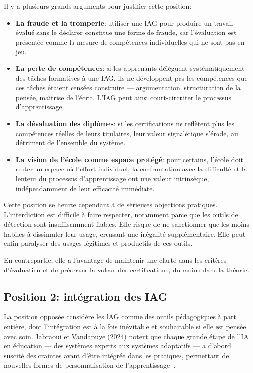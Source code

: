 Il y a plusieurs grands arguments pour justifier cette position:

\begin{itemize}
    \item \textbf{La fraude et la tromperie}: utiliser une IAG pour produire un travail \'evalu\'e sans le d\'eclarer constitue une forme de fraude, car l'\'evaluation est pr\'esent\'ee comme la mesure de comp\'etences individuelles qui ne sont pas en jeu.
    \item \textbf{La perte de comp\'etences}: si les apprenants d\'el\`eguent syst\'ematiquement des t\^aches formatives \`a une IAG, ils ne d\'eveloppent pas les comp\'etences que ces t\^aches \'etaient cens\'ees construire --- argumentation, structuration de la pens\'ee, ma\^\i trise de l'\'ecrit. 
    L'IAG peut ainsi \og{}court-circuiter\fg{} le processus d'apprentissage.
    \item \textbf{La d\'evaluation des dipl\^omes}: si les certifications ne refl\`etent plus les comp\'etences r\'eelles de leurs titulaires, leur valeur signal\'etique s'\'erode, au d\'etriment de l'ensemble du syst\`eme.
    \item \textbf{La vision de l'\'ecole comme espace prot\'eg\'e}: pour certains, l'\'ecole doit rester un espace o\`u l'effort individuel, la confrontation avec la difficult\'e et la lenteur du processus d'apprentissage ont une valeur intrins\`eque, ind\'ependamment de leur efficacit\'e imm\'ediate.
\end{itemize}

Cette position se heurte cependant \`a de s\'erieuses objections pratiques. 
L'interdiction est difficile \`a faire respecter, notamment parce que les outils de d\'etection sont insuffisamment fiables. 
Elle risque de ne sanctionner que les moins habiles \`a dissimuler leur usage, creusant une in\'egalit\'e suppl\'ementaire. 
Elle peut enfin paralyser des usages l\'egitimes et productifs de ces outils.

En contrepartie, elle a l'avantage de maintenir une clart\'e dans les crit\`eres d'\'evaluation et de pr\'eserver la valeur des certifications, du moins dans la th\'eorie.

\subsection*{Position 2: int\'egration des IAG}

La position oppos\'ee consid\`ere les IAG comme des outils p\'edagogiques \`a part enti\`ere, dont l'int\'egration est \`a la fois in\'evitable et souhaitable si elle est pens\'ee avec soin.
Jabraoui et Vandapuye (2024) notent que chaque grande \'etape de l'IA en \'education --- des syst\`emes experts aux syst\`emes adaptatifs --- a d'abord suscit\'e des craintes avant d'\^etre int\'egr\'ee dans les pratiques, permettant de nouvelles formes de personnalisation de l'apprentissage~\cite{jabraoui2024}.

